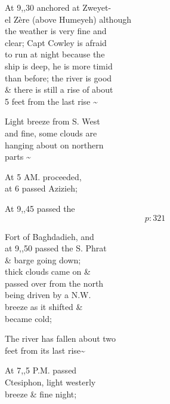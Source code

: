 \documentclass{report}
\begin{document}
	\par{
 	At 9,,30 anchored at Zweyet-\ \\el Zère (above Humeyeh) although\ \\the weather is very fine and\ \\clear; Capt Cowley is afraid\ \\to run at night because the\ \\ship is deep, he is more timid\ \\than before; the river is good\ \\\& there is still a rise of about\ \\5 feet from the last rise \~{}\ \\
	}

	\par{
 	Light breeze from S. West\ \\and fine, some clouds are\ \\hanging about on northern\ \\parts \~{}\ \\
	}

	\par{
 	At 5 AM. proceeded,\ \\at 6 passed Azizieh;\ \\
	}

	\par{
 	At 9,,45 passed the\ \\
  \[p: 321 \]

	}



	\par{
 	Fort of Baghdadieh, and\ \\at 9,,50 passed the S. Phrat\ \\\& barge going down;\ \\thick clouds came on \&\ \\passed over from the north\ \\being driven by a N.W.\ \\breeze as it shifted \&\ \\became cold;\ \\
	}

	\par{
 	The river has fallen about two\ \\feet from its last rise\~{}\ \\
	}

	\par{
 	At 7,,5 P.M. passed\ \\Ctesiphon, light westerly\ \\breeze \& fine night;\ \\
	}
\end{document}
